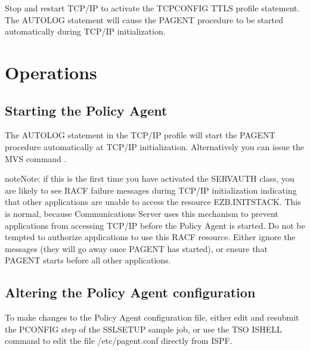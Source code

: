 \documentclass[letterpaper,10pt,english]{sphinxmanual}
\begin{document}
\begin{sphinxVerbatim}[commandchars=\\\{\}]
 
   
\end{sphinxVerbatim}

Stop and restart TCP/IP to activate the TCPCONFIG TTLS profile statement. The AUTOLOG statement will cause the PAGENT procedure to be started automatically during TCP/IP initialization.

\newpage


\section{Operations}
\label{\detokenize{connectivity_guide:index-158}}\label{\detokenize{connectivity_guide:operations}}

\subsection{Starting the Policy Agent}
\label{\detokenize{connectivity_guide:starting-the-policy-agent}}
The AUTOLOG statement in the TCP/IP profile will start the PAGENT procedure automatically at TCP/IP initialization. Alternatively you can issue the MVS command .

\begin{sphinxadmonition}{note}{Note:}
if this is the first time you have activated the SERVAUTH class, you are likely to see RACF failure messages during TCP/IP initialization indicating that other applications are unable to access the resource EZB.INITSTACK. This is normal, because Communications Server uses this mechanism to prevent applications from accessing TCP/IP before the Policy Agent is started. Do not be tempted to authorize applications to use this RACF resource. Either ignore the messages (they will go away once PAGENT has started), or
ensure that PAGENT starts before all other applications.
\end{sphinxadmonition}


\subsection{Altering the Policy Agent configuration}
\label{\detokenize{connectivity_guide:altering-the-policy-agent-configuration}}
To make changes to the Policy Agent configuration file, either edit and resubmit the PCONFIG step of the SSLSETUP sample job, or use the TSO ISHELL command to edit the file /etc/pagent.conf directly from ISPF.
\end{document}
